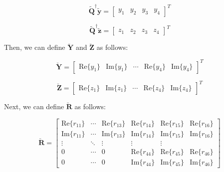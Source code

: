\documentclass[fleqn]{article}
\begin{document}
\begin{enumerate}
\begin{enumerate}
			\begin{equation*}
				\mathbf{\tilde{Q}}^{\dagger}\mathbf{\tilde{y}} = \begin{bmatrix} y_1 & y_2 & y_3 & y_4
				\end{bmatrix}^T
			\end{equation*}
		
			\begin{equation*}
				\mathbf{\tilde{Q}}^{\dagger}\mathbf{\tilde{z}} = \begin{bmatrix} z_1 & z_2 & z_3 & z_4
				\end{bmatrix}^T
			\end{equation*}
		
			Then, we can define $\mathbf{\breve{Y}}$ and $\mathbf{\breve{Z}}$ as follows:
		
			\begin{equation*}
				\mathbf{\breve{Y}} = \begin{bmatrix} \text{Re}\{y_1\} & \text{Im}\{y_1\} & \cdots & \text{Re}\{y_4\} & \text{Im}\{y_4\} \end{bmatrix}^T
			\end{equation*}
		
			\begin{equation*}
				\mathbf{\breve{Z}} = \begin{bmatrix} \text{Re}\{z_1\} & \text{Im}\{z_1\} & \cdots & \text{Re}\{z_4\} & \text{Im}\{z_4\} \end{bmatrix}^T
			\end{equation*}
		
			Next, we can define $\mathbf{\breve{R}}$ as follows:
		
			\begin{equation*}
				\mathbf{\breve{R}} = \begin{bmatrix}
					\text{Re}\{r_{11}\} & \cdots & \text{Re}\{r_{13}\} & \text{Re}\{r_{14}\} & \text{Re}\{r_{15}\} & \text{Re}\{r_{16}\} \\
					\text{Im}\{r_{11}\} & \cdots & \text{Im}\{r_{13}\} & \text{Im}\{r_{14}\} & \text{Im}\{r_{15}\} & \text{Im}\{r_{16}\} \\
					\vdots & \ddots & \vdots & \vdots & \vdots \\
					0 & \cdots & 0 & \text{Re}\{r_{44}\} & \text{Re}\{r_{45}\} & \text{Re}\{r_{46}\} \\
					0 & \cdots & 0 & \text{Im}\{r_{44}\} & \text{Im}\{r_{45}\} & \text{Im}\{r_{46}\}
				\end{bmatrix}
			\end{equation*}
		

\end{enumerate}
\end{enumerate}
\end{document}
